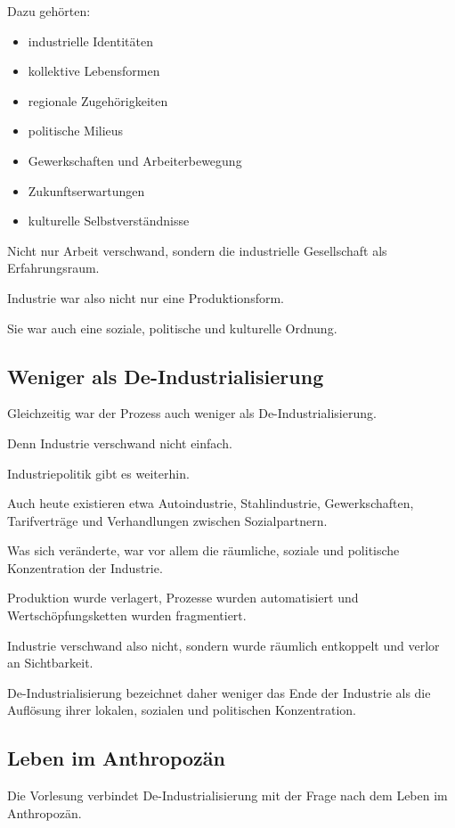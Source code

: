 Dazu gehörten:

\begin{itemize}
\item industrielle Identitäten
\item kollektive Lebensformen
\item regionale Zugehörigkeiten
\item politische Milieus
\item Gewerkschaften und Arbeiterbewegung
\item Zukunftserwartungen
\item kulturelle Selbstverständnisse
\end{itemize}

Nicht nur Arbeit verschwand,
sondern die industrielle Gesellschaft
als Erfahrungsraum.

Industrie war also nicht nur
eine Produktionsform.

Sie war auch eine soziale,
politische
und kulturelle Ordnung.

\subsection{Weniger als De-Industrialisierung}

Gleichzeitig war der Prozess
auch weniger als De-Industrialisierung.

Denn Industrie verschwand nicht einfach.

Industriepolitik gibt es weiterhin.

Auch heute existieren etwa
Autoindustrie,
Stahlindustrie,
Gewerkschaften,
Tarifverträge
und Verhandlungen zwischen Sozialpartnern.

Was sich veränderte,
war vor allem die räumliche,
soziale
und politische Konzentration der Industrie.

Produktion wurde verlagert,
Prozesse wurden automatisiert
und Wertschöpfungsketten wurden fragmentiert.

Industrie verschwand also nicht,
sondern wurde räumlich entkoppelt
und verlor an Sichtbarkeit.

De-Industrialisierung bezeichnet daher
weniger das Ende der Industrie
als die Auflösung ihrer lokalen,
sozialen
und politischen Konzentration.

\subsection{Leben im Anthropozän}

Die Vorlesung verbindet De-Industrialisierung
mit der Frage nach dem Leben im Anthropozän.

